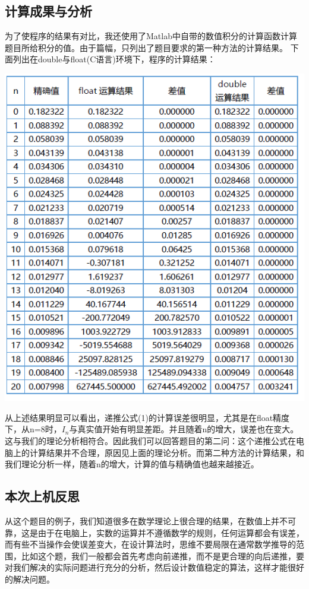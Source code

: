 \documentclass[10pt,a4paper]{ctexart}
\begin{document}
\subsection{计算成果与分析}
为了使程序的结果有对比，我还使用了Matlab中自带的数值积分的计算函数计算题目所给积分的值。由于篇幅，只列出了题目要求的第一种方法的计算结果。
下面列出在double与float(C语言)环境下，程序的计算结果：
\par
\centerline{\includegraphics{计算结果.png}}
\par
从上述结果明显可以看出，递推公式(1)的计算误差很明显，尤其是在float精度下，从n=8时，$I_n$与真实值开始有明显差距。并且随着n的增大，误差也在变大。这与我们的理论分析相符合。因此我们可以回答题目的第二问：这个递推公式在电脑上的计算结果并不合理，原因见上面的理论分析。而第二种方法的计算结果，和我们理论分析一样，随着n的增大，计算的值与精确值也越来越接近。
\subsection{本次上机反思}
从这个题目的例子，我们知道很多在数学理论上很合理的结果，在数值上并不可靠，这是由于在电脑上，实数的运算并不遵循数学的规则，任何运算都会有误差，而有些不当操作会使误差变大，在设计算法时，思维不要局限在通常数学推导的范围，比如这个题，我们一般都会首先考虑向前递推，而不是更合理的向后递推，要对我们解决的实际问题进行充分的分析，然后设计数值稳定的算法，这样才能很好的解决问题。
\end{document}
